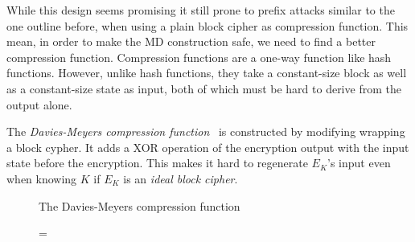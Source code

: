 While this design seems promising it still prone to prefix attacks similar to the one outline before, when using a plain block cipher as compression function.
This mean, in order to make the MD construction safe, we need to find a better compression function.
Compression functions are a one-way function like hash functions. However, unlike hash functions, they take a constant-size block as well as a constant-size state as input, both of which must be hard to derive from the output alone.

The \emph{Davies-Meyers compression function}~\cite{winternitz1984secure,black2002black} is constructed by modifying wrapping a block cypher.
It adds a XOR operation of the encryption output with the input state before the encryption.
This makes it hard to regenerate $E_K$'s input even when knowing $K$ if $E_K$ is an \emph{ideal block cipher}.

\begin{figure}

\caption{The Davies-Meyers compression function}
\end{figure}

\begin{figure}

\bnm
{} = 
\enm

\end{figure}

